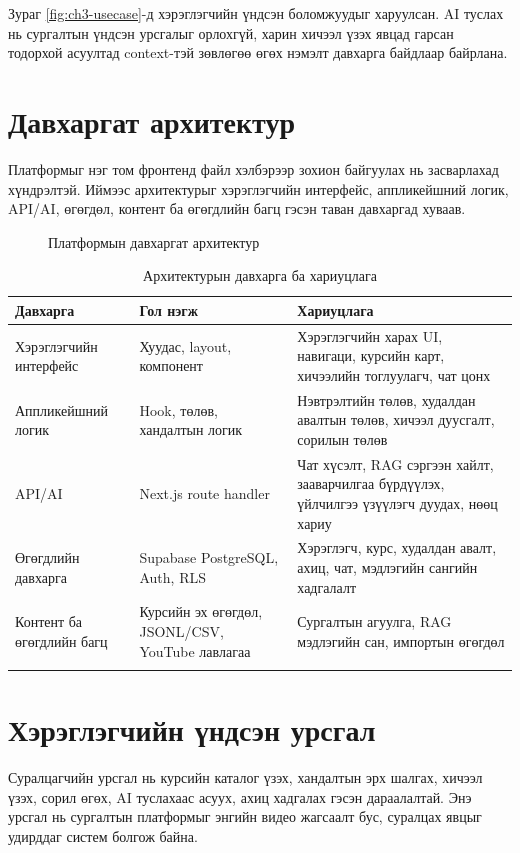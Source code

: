 Зураг \ref{fig:ch3-usecase}-д хэрэглэгчийн үндсэн боломжуудыг харуулсан. AI туслах нь сургалтын үндсэн урсгалыг орлохгүй, харин хичээл үзэх явцад гарсан тодорхой асуултад context-тэй зөвлөгөө өгөх нэмэлт давхарга байдлаар байрлана.

\section{Давхаргат архитектур}
Платформыг нэг том фронтенд файл хэлбэрээр зохион байгуулах нь засварлахад хүндрэлтэй. Иймээс архитектурыг хэрэглэгчийн интерфейс, аппликейшний логик, API/AI, өгөгдөл, контент ба өгөгдлийн багц гэсэн таван давхаргад хуваав.

\begin{figure}[H]
  \centering
  \resizebox{\textwidth}{!}{}
  \caption[Платформын давхаргат архитектур]{Платформын давхаргат архитектур}
  \label{fig:ch3-layered}
\end{figure}

\begin{longtable}{|p{}|p{}|p{}|}
  \hline
  \textbf{Давхарга} & \textbf{Гол нэгж} & \textbf{Хариуцлага} \\ \hline
  Хэрэглэгчийн интерфейс & Хуудас, layout, компонент & Хэрэглэгчийн харах UI, навигаци, курсийн карт, хичээлийн тоглуулагч, чат цонх \\ \hline
  Аппликейшний логик & Hook, төлөв, хандалтын логик & Нэвтрэлтийн төлөв, худалдан авалтын төлөв, хичээл дуусгалт, сорилын төлөв \\ \hline
  API/AI & Next.js route handler & Чат хүсэлт, RAG сэргээн хайлт, зааварчилгаа бүрдүүлэх, үйлчилгээ үзүүлэгч дуудах, нөөц хариу \\ \hline
  Өгөгдлийн давхарга & Supabase PostgreSQL, Auth, RLS & Хэрэглэгч, курс, худалдан авалт, ахиц, чат, мэдлэгийн сангийн хадгалалт \\ \hline
  Контент ба өгөгдлийн багц & Курсийн эх өгөгдөл, JSONL/CSV, YouTube лавлагаа & Сургалтын агуулга, RAG мэдлэгийн сан, импортын өгөгдөл \\ \hline
  \caption{Архитектурын давхарга ба хариуцлага}
  \label{tab:ch3-layers}
\end{longtable}

\section{Хэрэглэгчийн үндсэн урсгал}
Суралцагчийн урсгал нь курсийн каталог үзэх, хандалтын эрх шалгах, хичээл үзэх, сорил өгөх, AI туслахаас асуух, ахиц хадгалах гэсэн дараалалтай. Энэ урсгал нь сургалтын платформыг энгийн видео жагсаалт бус, суралцах явцыг удирддаг систем болгож байна.

